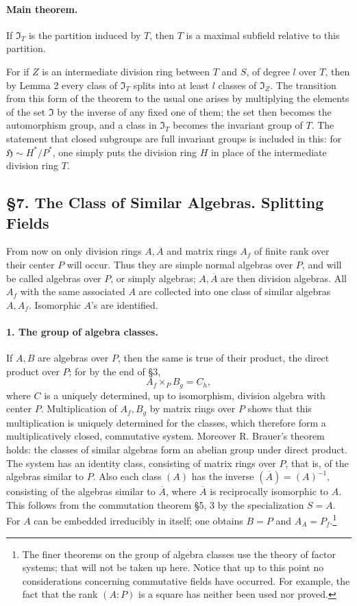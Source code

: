 \documentclass[11pt]{article}
\begin{document}
\paragraph{Main theorem.}
If \(\mathfrak I_T\) is the partition induced by \(T\), then \(T\) is a maximal subfield relative to this partition.

For if \(Z\) is an intermediate division ring between \(T\) and \(S\), of degree \(l\) over \(T\), then by Lemma 2 every class of \(\mathfrak I_T\) splits into at least \(l\) classes of \(\mathfrak I_Z\). The transition from this form of the theorem to the usual one arises by multiplying the elements of the set \(\mathfrak I\) by the inverse of any fixed one of them; the set then becomes the automorphism group, and a class in \(\mathfrak I_T\) becomes the invariant group of \(T\). The statement that closed subgroups are full invariant groups is included in this: for \(\mathfrak H\sim H^*/P^*\), one simply puts the division ring \(H\) in place of the intermediate division ring \(T\).

\subsection*{§7. The Class of Similar Algebras. Splitting Fields}

From now on only division rings \(A,\overline A\) and matrix rings \(A_f\) of finite rank over their center \(P\) will occur. Thus they are simple normal algebras over \(P\), and will be called algebras over \(P\), or simply algebras; \(A,\overline A\) are then division algebras. All \(A_f\) with the same associated \(A\) are collected into one class of similar algebras \(A,A_f\). Isomorphic \(A\)'s are identified.

\paragraph{1. The group of algebra classes.}
If \(A,B\) are algebras over \(P\), then the same is true of their product, the direct product over \(P\); for by the end of §3,
\[
        A_f\times_P B_g=C_h,
\]
where \(C\) is a uniquely determined, up to isomorphism, division algebra with center \(P\). Multiplication of \(A_f,B_g\) by matrix rings over \(P\) shows that this multiplication is uniquely determined for the classes, which therefore form a multiplicatively closed, commutative system. Moreover R. Brauer's theorem holds: the classes of similar algebras form an abelian group under direct product. The system has an identity class, consisting of matrix rings over \(P\), that is, of the algebras similar to \(P\). Also each class \((A)\) has the inverse \((\overline A)=(A)^{-1}\), consisting of the algebras similar to \(\overline A\), where \(\overline A\) is reciprocally isomorphic to \(A\). This follows from the commutation theorem §5, 3 by the specialization \(S=A\). For \(A\) can be embedded irreducibly in itself; one obtains \(B=P\) and \(A_A=P_f\).\footnote{The finer theorems on the group of algebra classes use the theory of factor systems; that will not be taken up here. Notice that up to this point no considerations concerning commutative fields have occurred. For example, the fact that the rank \((A:P)\) is a square has neither been used nor proved.}
\end{document}
